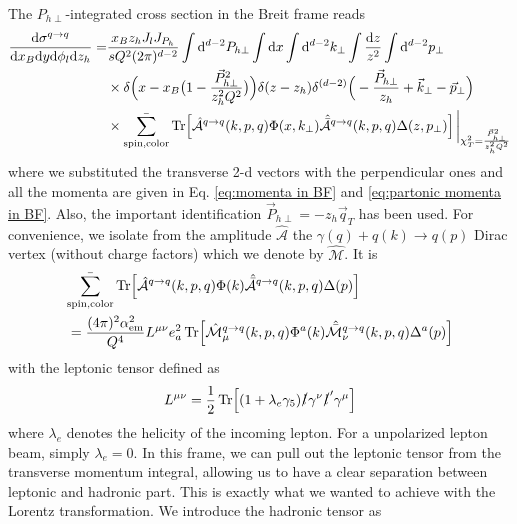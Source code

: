 
 The $P_{h\perp}$-integrated cross section in the Breit frame reads
\begin{equation}
    \begin{aligned}
        \frac{\dd \sigma^{q \to q}}{\dd x_B \dd y \dd \phi_l\dd z_h } = &\frac{x_B z_h J_lJ_{P_h}}{sQ^2(2\pi)^{d-2}}\int\dd^{d-2}P_{h\perp}\int \dd x \int \dd^{d-2}k_\perp\int \frac{\dd z}{z^2}\int \dd^{d-2}p_\perp \,\\
        &\times\delta\Big(x-x_B\big(1-\frac{\vec P^2_{h\perp}}{z_h^2Q^2}\big)\Big)\delta(z-z_h)\delta^{(d-2)}\Big(-\frac{\vec P_{h\perp}}{z_h}+\vec k_\perp-\vec p_\perp\Big)\\&\times\bar{\sum_{\text{spin,color}}}\Tr[\hat{\mathcal{A}}^{q\to q}(k,p,q) \Phi(x,k_\perp)\hat{\bar{\mathcal{A}}}^{q\to q}(k,p,q)\Delta(z,p_\perp)]\eval_{\chi_T^2=\frac{\vec P^2_{h\perp}}{z_h^2Q^2}}
    \end{aligned}
\end{equation}
where we substituted the transverse 2-d vectors with the perpendicular ones and all the momenta are given in Eq. \eqref{eq:momenta in BF} and \eqref{eq:partonic momenta in BF}. Also, the important identification $\vec P_{h\perp}=-z_h\vec q_T$ has been used. For convenience, we isolate from the amplitude $\hat{\mathcal{A}}$ the $\gamma(q)+q(k)\to q(p)$ Dirac vertex (without charge factors) which we denote by $\hat{\mathcal{M}}$. It is
\begin{equation}
\begin{aligned}
      &\bar{\sum_{\text{spin,color}}}\Tr[\hat{\mathcal{A}}^{q\to q}(k,p,q) \Phi(k)\hat{\bar{\mathcal{A}}}^{q\to q}(k,p,q)\Delta(p)]\\&=\frac{(4\pi)^2\alpha_{\text{em}}^2}{Q^4}L^{\mu\nu} e_a^2\Tr[\hat{\mathcal{M}}_\mu^{q\to q}(k,p,q) \Phi^a(k)\hat{\bar{\mathcal{M}}}_\nu^{q\to q}(k,p,q) \Delta^a(p)]
\end{aligned}
\end{equation}
with the leptonic tensor defined as
\begin{equation}
            L^{\mu\nu}=\frac{1}{2}\Tr[(1+\lambda_e\gamma_5)\slashed{l}\gamma^\nu \slashed{l}'\gamma^\mu]
\end{equation}
where $\lambda_e$ denotes the helicity of the incoming lepton. For a unpolarized lepton beam, simply $\lambda_e=0$. In this frame, we can pull out the leptonic tensor from the transverse momentum integral, allowing us to have a clear separation between leptonic and hadronic part. This is exactly what we wanted to achieve with the Lorentz transformation. We introduce the hadronic tensor as
